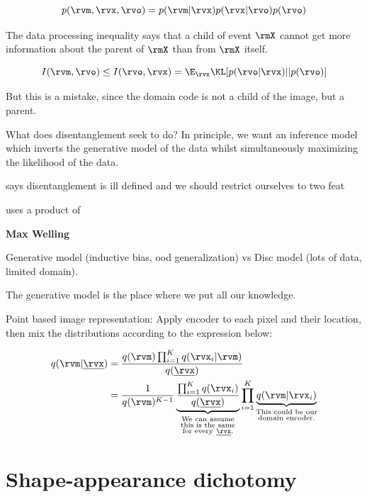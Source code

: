 \begin{equation}
    p(\rvm, \rvx, \rvo) = p(\rvm | \rvx) p(\rvx | \rvo) p(\rvo)
\end{equation}

The data processing inequality \citep{cover1999elements} says that a child of event $\rmX$ cannot get more information about the parent of $\rmX$ than from $\rmX$ itself.

\begin{equation}
I(\rvm, \rvo) \leq I(\rvo, \rvx) = \E_{\rvx} \KL[p(\rvo | \rvx) || p(\rvo)]
\end{equation}

But this is a mistake, since the domain code is not a child of the image, but a parent.

What does disentanglement seek to do? In principle, we want an inference model which inverts the generative model of the data whilst simultaneously maximizing the likelihood of the data.

\citet{mathieu2019disentangling} says disentanglement is ill defined and we should restrict ourselves to two feat

\citet{bouchacourt2017multi} uses a product of 

\textbf{Max Welling}

Generative model (inductive bias, ood generalization) vs Disc model (lots of data, limited domain).

The generative model is the place where we put all our knowledge.

Point based image representation: Apply encoder to each pixel and their location, then mix the distributions according to the expression below:

\begin{align}
    q(\rvm | \underline{\rvx})
    &= \frac{q(\rvm) \prod_{i=1}^K q(\rvx_i | \rvm)}{q(\underline{\rvx})} \\
    &= \frac{1}{q(\rvm)^{K-1}} \underbrace{\frac{\prod_{i=1}^K q(\rvx_i)}{q(\underline{\rvx})}}_{\substack{\text{We~can~assume} \\ \text{this~is~the~same} \\ \text{for~every} ~ \underline{\rvx}.}} \prod_{i=1}^K \underbrace{q(\rvm | \rvx_i)}_{\substack{\text{This~could~be~our} \\ \text{domain~encoder.}}}
\end{align}


\cite{bouchacourt2017multi}



\section{Shape-appearance dichotomy}

